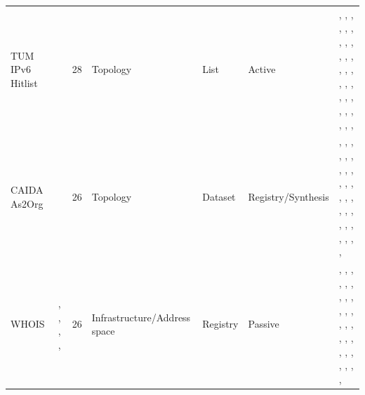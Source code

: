 \begin{table}[h!]
\begin{tabular}{lllllll}
TUM IPv6 Hitlist & \cite{gasser2016scanningipv6internetcomprehensive} & 28 & Topology & List & Active & \cite{10.1145/3730567.3764484}, \cite{10.1145/3646547.3688420}, \cite{10.1145/3646547.3688417}, \cite{10.1145/3646547.3688449}, \cite{10.1145/3646547.3689017}, \cite{10.1145/3517745.3561431}, \cite{10.1145/3517745.3561440}, \cite{10.1145/3487552.3487826}, \cite{10.1145/3487552.3487848}, \cite{10.1007/978-3-030-72582-2_32}, \cite{10.1007/978-3-030-98785-5_28}, \cite{10.1007/978-3-031-28486-1_2}, \cite{10.1007/978-3-031-56249-5_5}, \cite{10.1007/978-3-031-56252-5_13}, \cite{10.1007/978-3-031-85960-1_2}, \cite{10.1007/978-3-031-85960-1_3}, \cite{10.1145/3730567.3764502}, \cite{10.1007/978-3-031-56249-5_4}, \cite{10.1007/978-3-031-85960-1_16}, \cite{10.1145/3777912.3839826}, \cite{10.1007/978-3-032-18268-5_6}, \cite{10.1007/978-3-032-18268-5_10}, \cite{10.1145/3777912.3809157}, \cite{10.1145/3777912.3839803}, \cite{10.1145/3777912.3839828}, \cite{10.1145/3777912.3809144}, \cite{10.1145/3777912.3809137}, \cite{10.1145/3777912.3809139} \\
CAIDA As2Org & \cite{caidaas2org} & 26 & Topology & Dataset & Registry/Synthesis & \cite{10.1145/3730567.3732918}, \cite{10.1145/3730567.3764485}, \cite{10.1145/3730567.3732917}, \cite{10.1145/3646547.3689010}, \cite{10.1145/3618257.3624838}, \cite{10.1145/3618257.3624831}, \cite{10.1145/3618257.3624819}, \cite{10.1145/3517745.3561458}, \cite{10.1145/3517745.3561419}, \cite{10.1145/3517745.3561425}, \cite{10.1145/3487552.3487825}, \cite{10.1145/3487552.3487822}, \cite{10.1007/978-3-030-98785-5_14}, \cite{10.1007/978-3-030-98785-5_15}, \cite{10.1007/978-3-030-98785-5_29}, \cite{10.1007/978-3-031-28486-1_10}, \cite{10.1007/978-3-031-28486-1_15}, \cite{10.1007/978-3-031-28486-1_17}, \cite{10.1007/978-3-031-28486-1_23}, \cite{10.1007/978-3-031-85960-1_3}, \cite{10.1007/978-3-031-85960-1_9}, \cite{10.1007/978-3-032-18268-5_5}, \cite{10.1145/3777912.3839828}, \cite{10.1145/3777912.3809143}, \cite{10.1145/3777912.3809144}, \cite{10.1145/3777912.3839812} \\
WHOIS & \cite{arinwhois}, \cite{ripewhois}, \cite{afrinicwhois}, \cite{lacnicwhois}, \cite{apnicwhois} & 26 & Infrastructure/Address space & Registry & Passive & \cite{10.1145/3730567.3764491}, \cite{10.1145/3730567.3732918}, \cite{10.1145/3730567.3764485}, \cite{10.1145/3730567.3764452}, \cite{10.1145/3646547.3688410}, \cite{10.1145/3646547.3688441}, \cite{10.1145/3646547.3689010}, \cite{10.1145/3618257.3624805}, \cite{10.1145/3618257.3624802}, \cite{10.1145/3618257.3624803}, \cite{10.1145/3517745.3561440}, \cite{10.1145/3487552.3487822}, \cite{10.1007/978-3-030-72582-2_3}, \cite{10.1007/978-3-030-72582-2_4}, \cite{10.1007/978-3-030-72582-2_14}, \cite{10.1007/978-3-030-98785-5_6}, \cite{10.1007/978-3-031-28486-1_15}, \cite{10.1007/978-3-031-56249-5_9}, \cite{10.1007/978-3-031-56249-5_10}, \cite{10.1007/978-3-031-85960-1_9}, \cite{10.1145/3777912.3809135}, \cite{10.1145/3777912.3809155}, \cite{10.1007/978-3-032-18268-5_15}, \cite{10.1145/3777912.3839793}, \cite{10.1145/3777912.3839795}, \cite{10.1145/3777912.3809139} \\

\end{tabular}
\end{table}
